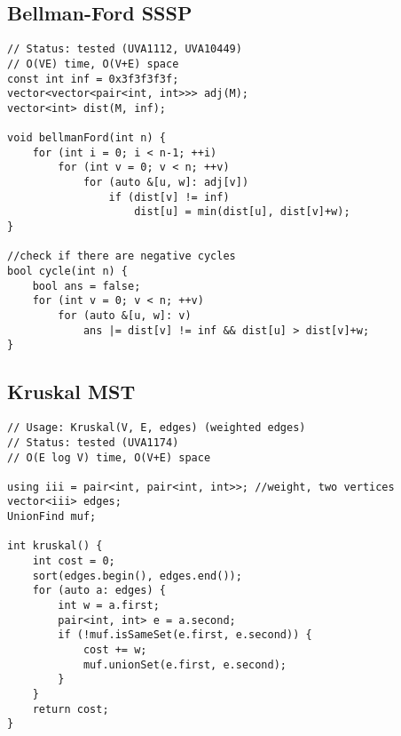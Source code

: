 \documentclass[12pt, a4paper, twoside]{article}
\begin{document}
\subsection{Bellman-Ford SSSP}
\begin{lstlisting}
// Status: tested (UVA1112, UVA10449)
// O(VE) time, O(V+E) space
const int inf = 0x3f3f3f3f;
vector<vector<pair<int, int>>> adj(M);
vector<int> dist(M, inf);

void bellmanFord(int n) {
	for (int i = 0; i < n-1; ++i)
		for (int v = 0; v < n; ++v)
			for (auto &[u, w]: adj[v])
				if (dist[v] != inf)
					dist[u] = min(dist[u], dist[v]+w);
}

//check if there are negative cycles
bool cycle(int n) {
	bool ans = false;
	for (int v = 0; v < n; ++v)
		for (auto &[u, w]: v)
			ans |= dist[v] != inf && dist[u] > dist[v]+w;
}
\end{lstlisting}

\subsection{Kruskal MST}
\begin{lstlisting}
// Usage: Kruskal(V, E, edges) (weighted edges)
// Status: tested (UVA1174)
// O(E log V) time, O(V+E) space

using iii = pair<int, pair<int, int>>; //weight, two vertices
vector<iii> edges;
UnionFind muf;

int kruskal() {
	int cost = 0;
	sort(edges.begin(), edges.end());
	for (auto a: edges) {
		int w = a.first;
		pair<int, int> e = a.second;
		if (!muf.isSameSet(e.first, e.second)) {
			cost += w;
			muf.unionSet(e.first, e.second);
		}
	}
	return cost;
}
\end{lstlisting}
\end{document}
